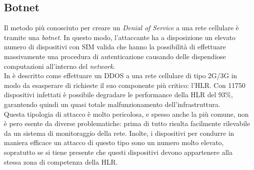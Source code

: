 \subsection{Botnet}
Il metodo più conosciuto per creare un \textit{Denial of Service} a una rete cellulare è tramite una \textit{botnet}.
In questo modo, l'attaccante ha a disposizione un elevato numero di dispositivi con SIM valida che hanno la possibilità di effettuare massivamente una procedura
di autenticazione causando delle dispendiose computazioni all'interno del \textit{network}.\\
In \cite{measuring-dos} è descritto come effettuare un DDOS a una rete cellulare di tipo 2G/3G in modo da esasperare di richieste il suo componente più critico: l'HLR.
Con 11750 dispositivi infettati è possibile degradare le performance della HLR del 93\%\cite{measuring-dos}, garantendo quindi un quasi totale malfunzionamento dell'infrastruttura.\\
Questa tipologia di attacco è molto pericolosa, e spesso anche la più comune, non è pero esente da diverse problematiche: prima di tutto risulta facilmente rilevabile da un sistema di 
monitoraggio della rete. Inolte, i dispositivi per condurre in maniera efficace un attacco di questo tipo sono un numero molto elevato, sopratutto se si tiene presente che questi dispositivi devono 
appartenere alla stessa zona di competenza della HLR.\\

\clearpage

